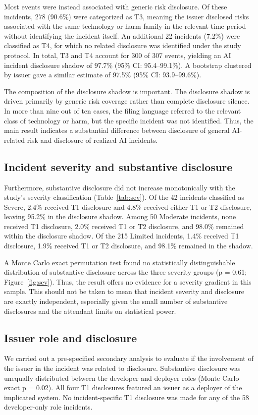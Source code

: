 \documentclass[utf8]{FrontiersinHarvard}
\begin{document}
Most events were instead associated with generic risk disclosure. Of these incidents, 278 (90.6\%) were categorized as T3, meaning the issuer disclosed risks associated with the same technology or harm family in the relevant time period without identifying the incident itself. An additional 22 incidents (7.2\%) were classified as T4, for which no related disclosure was identified under the study protocol. In total, T3 and T4 account for 300 of 307 events, yielding an AI incident disclosure shadow of 97.7\% (95\% CI: 95.4--99.1\%). A bootstrap clustered by issuer gave a similar estimate of 97.5\% (95\% CI: 93.9--99.6\%).

The composition of the disclosure shadow is important. The disclosure shadow is driven primarily by generic risk coverage rather than complete disclosure silence. In more than nine out of ten cases, the filing language referred to the relevant class of technology or harm, but the specific incident was not identified. Thus, the main result indicates a substantial difference between disclosure of general AI-related risk and disclosure of realized AI incidents.

\subsection{Incident severity and substantive disclosure}
Furthermore, substantive disclosure did not increase monotonically with the study's severity classification (Table~\ref{tab:sev}). Of the 42 incidents classified as Severe, 2.4\% received T1 disclosure and 4.8\% received either T1 or T2 disclosure, leaving 95.2\% in the disclosure shadow. Among 50 Moderate incidents, none received T1 disclosure, 2.0\% received T1 or T2 disclosure, and 98.0\% remained within the disclosure shadow. Of the 215 Limited incidents, 1.4\% received T1 disclosure, 1.9\% received T1 or T2 disclosure, and 98.1\% remained in the shadow.

A Monte Carlo exact permutation test found no statistically distinguishable distribution of substantive disclosure across the three severity groups (p = 0.61; Figure~\ref{fig:sev}). Thus, the result offers no evidence for a severity gradient in this sample. This should not be taken to mean that incident severity and disclosure are exactly independent, especially given the small number of substantive disclosures and the attendant limits on statistical power.

\subsection{Issuer role and disclosure}
We carried out a pre-specified secondary analysis to evaluate if the involvement of the issuer in the incident was related to disclosure. Substantive disclosure was unequally distributed between the developer and deployer roles (Monte Carlo exact p = 0.02). All four T1 disclosures featured an issuer as a deployer of the implicated system. No incident-specific T1 disclosure was made for any of the 58 developer-only role incidents.
\end{document}
